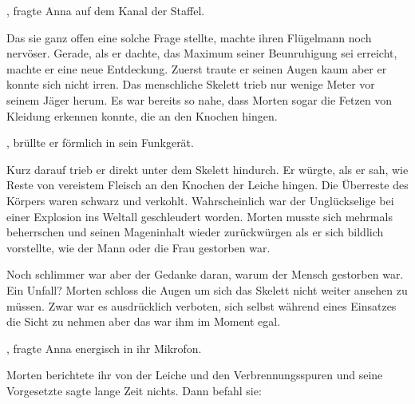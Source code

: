 \par

, fragte Anna auf dem Kanal der Staffel.

\par

Das sie ganz offen eine solche Frage stellte, machte ihren Flügelmann noch nervöser. Gerade, als er dachte, das Maximum seiner Beunruhigung sei erreicht, machte er eine neue Entdeckung. Zuerst traute er seinen Augen kaum aber er konnte sich nicht irren. Das menschliche Skelett trieb nur wenige Meter vor seinem Jäger herum. Es war bereits so nahe, dass Morten sogar die Fetzen von Kleidung erkennen konnte, die an den Knochen hingen.

\par

, brüllte er förmlich in sein Funkgerät.

\par

Kurz darauf trieb er direkt unter dem Skelett hindurch. Er würgte, als er sah, wie Reste von vereistem Fleisch an den Knochen der Leiche hingen. Die Überreste des Körpers waren schwarz und verkohlt. Wahrscheinlich war der Unglückselige bei einer Explosion ins Weltall geschleudert worden. Morten musste sich mehrmals beherrschen und seinen Mageninhalt wieder zurückwürgen als er sich bildlich vorstellte, wie der Mann oder die Frau gestorben war.

\par

Noch schlimmer war aber der Gedanke daran, warum der Mensch gestorben war. Ein Unfall? Morten schloss die Augen um sich das Skelett nicht weiter ansehen zu müssen. Zwar war es ausdrücklich verboten, sich selbst während eines Einsatzes die Sicht zu nehmen aber das war ihm im Moment egal.

\par

, fragte Anna energisch in ihr Mikrofon.

\par

Morten berichtete ihr von der Leiche und den Verbrennungsspuren und seine Vorgesetzte sagte lange Zeit nichts. Dann befahl sie: 

\par

